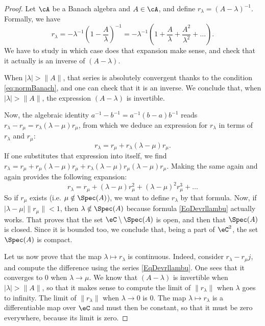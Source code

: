 \begin{proof}
	Let $\cA$ be a Banach algebra and $A\in\cA$, and define $r_{\lambda}=(A-\lambda)^{-1}$. Formally, we have
	\[
	  r_{\lambda}=-\lambda^{-1}\left( 1-\frac{ A }{ \lambda } \right)^{-1}=-\lambda^{-1}\left( 1+\frac{ A }{ \lambda }+\frac{ A^2 }{ \lambda^2 }+\ldots \right).
	\]
	We have to study in which case does that expansion make sense, and check that it actually is an inverse of $(A-\lambda)$.

	When $| \lambda |>\| A \|$, that series is absolutely convergent thanks to the condition \eqref{eq:normBanach}, and one can check that it is an inverse. We conclude that, when $| \lambda |>\| A \|$, the expression $(A-\lambda)$ is invertible.

	Now, the algebraic identity $a^{-1}-b^{-1}=a^{-1}(b-a)b^{-1}$ reads $r_{\lambda}-r_{\mu}=r_{\lambda}(\lambda-\mu)r_{\mu}$, from which we deduce an expression for $r_{\lambda}$ in terms of $r_{\lambda}$ and $r_{\mu}$:
	\[
	  r_{\lambda}=r_{\mu}+r_{\lambda}(\lambda-\mu)r_{\mu}.
	\]
	If one substitutes that expression into itself, we find $r_{\lambda}=r_{\mu}+r_{\mu}(\lambda-\mu)r_{\mu}+r_{\lambda}(\lambda-\mu)r_{\mu}(\lambda-\mu)r_{\mu}$. Making the same again and again provides the following expansion:
	\begin{equation}		\label{EqDevrllambu}
		r_{\lambda}=r_{\mu}+(\lambda-\mu)r_{\mu}^2+(\lambda-\mu)^2r_{\mu}^3+\ldots
	\end{equation}
	So if $r_{\mu}$ exists (i.e. $\mu\notin\Spec(A)$), we want to define $r_{\lambda}$ by that formula. Now, if $| \lambda-\mu |\| r_{\mu} \|<1$, then $\lambda\notin\Spec(A)$ because formula \eqref{EqDevrllambu} actually works. That proves that the set $\eC\setminus\Spec(A)$ is open, and then that $\Spec(A)$ is closed. Since it is bounded too, we conclude that, being a part of $\eC^2$, the set $\Spec(A)$ is compact.

	Let us now prove that the map $\lambda\mapsto r_{\lambda}$ is continuous. Indeed, consider $r_{\lambda}-r_{\mu}j$, and compute the difference using the series \eqref{EqDevrllambu}. One sees that it converges to $0$ when $\lambda\to\mu$. We know that $(A-\lambda)$ is invertible when $| \lambda |>\| A \|$, so that it makes sense to compute the limit of $\| r_{\lambda} \|$ when $\lambda$ goes to infinity. The limit of $\| r_{\lambda} \|$ when $\lambda\to 0$ is $0$. The map $\lambda\mapsto r_{\lambda}$ is a differentiable map over $\eC$ and must then be constant, so that it must be zero everywhere, because its limit is zero.


\end{proof}
